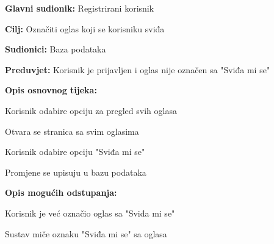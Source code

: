 					\noindent {}
					\begin{packed_item}
	
						\item \textbf{Glavni sudionik: }Registrirani korisnik
						\item  \textbf{Cilj:} Označiti oglas koji se korisniku sviđa
						\item  \textbf{Sudionici:} Baza podataka
						\item  \textbf{Preduvjet:} Korisnik je prijavljen i oglas nije označen sa "Sviđa mi se"
						\item  \textbf{Opis osnovnog tijeka:}
						
						\item[] \begin{packed_enum}
	
							\item Korisnik odabire opciju za pregled svih oglasa
							\item Otvara se stranica sa svim oglasima
							\item Korisnik odabire opciju "Sviđa mi se"
							\item Promjene se upisuju u bazu podataka

						\end{packed_enum}		
						
						\item  \textbf{Opis mogućih odstupanja:}
						
						\item[] \begin{packed_item}
	
							\item[3.a] Korisnik je već označio oglas sa "Sviđa mi se"
								\begin{packed_item}
									\item Sustav miče oznaku "Sviđa mi se" sa oglasa
								\end{packed_item}
								
						\end{packed_item}				
					\end{packed_item}
					

